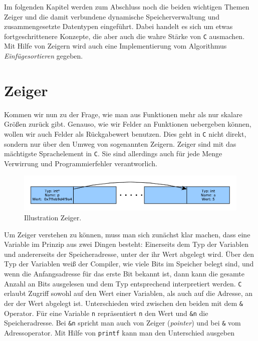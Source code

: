 Im folgenden Kapitel werden zum Abschluss noch die beiden wichtigen Themen Zeiger und die damit verbundene dynamische Speicherverwaltung und zusammengesetzte Datentypen eingeführt.
Dabei handelt es sich um etwas fortgeschrittenere Konzepte, die aber auch die wahre Stärke von \texttt{C} ausmachen.
Mit Hilfe von Zeigern wird auch eine Implementierung vom Algorithmus \emph{Einfügesortieren} gegeben.

\section{Zeiger}\label{sec:zeiger}

Kommen wir nun zu der Frage, wie man aus Funktionen mehr als nur skalare Größen zurück gibt.
Genauso, wie wir Felder an Funktionen uebergeben können, wollen wir auch Felder als Rückgabewert benutzen.
Dies geht in \texttt{C} nicht direkt, sondern nur über den Umweg von sogenannten Zeigern.
Zeiger sind mit das mächtigste Sprachelement in \texttt{C}.
Sie sind allerdings auch für jede Menge Verwirrung und Programmierfehler verantworlich.

\begin{figure}[h]
  \centering
  \includegraphics[width=\linewidth]{graphics/zeiger}
  \caption{\label{fig:zeiger} Illustration Zeiger.}
\end{figure}

Um Zeiger verstehen zu können, muss man sich zunächst klar machen, dass eine Variable im Prinzip aus zwei Dingen besteht:
Einerseits dem Typ der Variablen und andererseits der Speicheradresse, unter der ihr Wert abgelegt wird.
Über den Typ der Variablen weiß der Compiler, wie viele Bits im Speicher belegt sind, und wenn die Anfangsadresse für das erste Bit bekannt ist, dann kann die gesamte Anzahl an Bits ausgelesen und dem Typ entsprechend interpretiert werden.
\texttt{C} erlaubt Zugriff sowohl auf den Wert einer Variablen, als auch auf die Adresse, an der der Wert abgelegt ist.
Unterschieden wird zwischen den beiden mit dem \verb|&| Operator.
Für eine Variable \verb|n| repräsentiert \verb|n| den Wert und \verb|&n| die Speicheradresse.
Bei \verb|&n| spricht man auch von Zeiger (\emph{pointer}) und bei \verb|&| vom Adressoperator.\index{\&}
Mit Hilfe von \texttt{printf} kann man den Unterschied ausgeben

